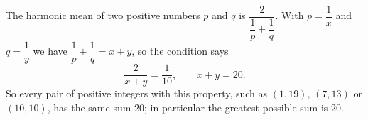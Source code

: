 The harmonic mean of two positive numbers $p$ and $q$ is $\dfrac{2}{\dfrac{1}{p}+\dfrac{1}{q}}$. With $p=\dfrac{1}{x}$ and $q=\dfrac{1}{y}$ we have $\dfrac{1}{p}+\dfrac{1}{q}=x+y$, so the condition says
\[\dfrac{2}{x+y}=\dfrac{1}{10},\qquad x+y=\boxed{20}.\]
So every pair of positive integers with this property, such as $(1,19)$, $(7,13)$ or $(10,10)$, has the same sum $20$; in particular the greatest possible sum is $20$.

